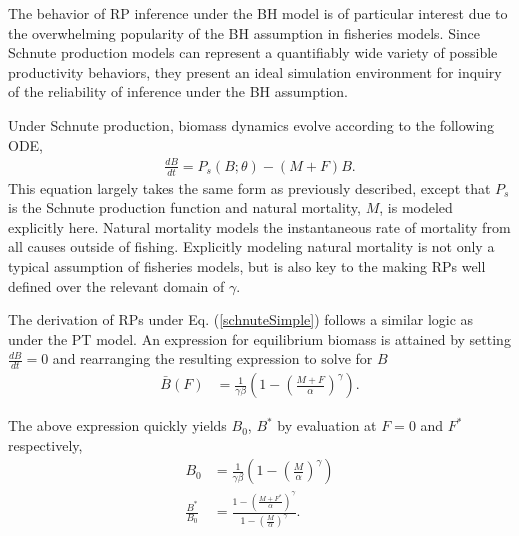 %
The behavior of RP inference under the BH model is of particular interest due 
to the overwhelming popularity of the BH assumption in fisheries models.
Since Schnute production models can represent a quantifiably wide variety 
of possible productivity behaviors, they present an ideal simulation 
environment for inquiry of the reliability of inference under the BH 
assumption.

%
Under Schnute production, biomass dynamics evolve according to the following ODE, 
%
\begin{align}
\frac{dB}{dt} = P_s(B;\theta) - (M+F)B. \label{schnuteSimple}
\end{align}
%
This equation largely takes the same form as previously described, except 
that $P_s$ is the Schnute production function and natural mortality, $M$, is modeled 
explicitly here. %
Natural mortality models the instantaneous rate of mortality from all causes 
outside of fishing. Explicitly modeling natural mortality is not 
only a typical assumption of fisheries models, but is also key to the making 
RPs well defined over the relevant domain of $\gamma$.



%
The derivation of RPs under Eq. (\ref{schnuteSimple}) follows a similar logic 
as under the PT model. An expression for equilibrium biomass is attained by 
setting $\frac{dB}{dt}=0$ and rearranging the resulting expression to solve 
for $B$ 
%
\begin{align}
\bar{B}(F) &= \frac{1}{\gamma \beta}\left(1-\left(\frac{M+F}{\alpha}\right)^\gamma\right).
\label{BsEq}
\end{align}

%
The above expression quickly yields $B_0$, $B^*$ by evaluation at $F=0$ and $F^*$ respectively,
\begin{align}
B_0 &= \frac{1}{\gamma \beta}\left(1-\left(\frac{M}{\alpha}\right)^\gamma\right) \label{B0S}\\
\frac{B^*}{B_0} &= \frac{1-\left(\frac{M+F^*}{\alpha}\right)^\gamma}{ 1-\left(\frac{M}{\alpha}\right)^\gamma }. \label{BratS}
\end{align}

